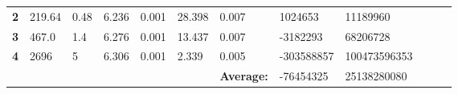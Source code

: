 \documentclass[12pt]{article}
\begin{document}
\begin{table}[H]
\begin{adjustwidth}{-1cm}{}
\begin{tabular}{|l|l|l|l|l|l|l|l|l|lll}
    \textbf{2}               & 219.64                                                                                  & 0.48                                                                                  & 6.236                                     & 0.001                                                                                & 28.398                                                                                & 0.007                                                                                  & 1024653                                                                                             & 11189960                                                                                  &  &  &  \\ \cline{1-9}
    \textbf{3}               & 467.0                                                                                     & 1.4                                                                                  & 6.276                                     & 0.001                                                                                & 13.437                                                                                & 0.007                                                                                   & -3182293                                                                                             & 68206728                                                                                   &  &  &  \\ \cline{1-9}
    \textbf{4}               & 2696                                                                                    & 5                                                                                   & 6.306                                     & 0.001                                                                                & 2.339                                                                                 & 0.005                                                                                  & -303588857                                                                                             & 100473596353                                                                                   &  &  &  \\ \cline{1-9}
                             &                                                                                         &                                                                                          &                                           &                                                                                 &        & \multicolumn{1}{c|}{\textbf{Average:}}                                                & -76454325                                                                                     & 25138280080                                                                                   &  &  &  \\ \cline{1-9}

\end{tabular}
\end{adjustwidth}
\end{table}
\end{document}
